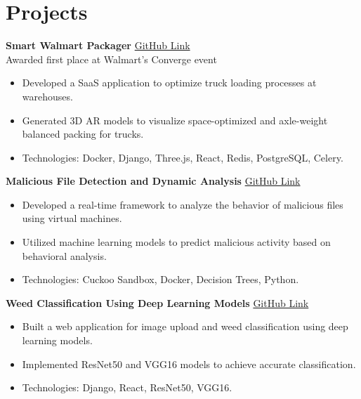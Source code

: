 \documentclass[a4paper,10pt]{article}
\begin{document}
\vspace{-1mm}

\section*{Projects}

\textbf{Smart Walmart Packager} \hfill \href{https://nalin-kumar-gupta.github.io/swp-demo/index.html}{GitHub Link} \\
Awarded first place at Walmart’s Converge event \\
\vspace{-5mm}
\begin{itemize}[noitemsep]
    \item Developed a SaaS application to optimize truck loading processes at warehouses.
    \item Generated 3D AR models to visualize space-optimized and axle-weight balanced packing for trucks.
    \item Technologies: Docker, Django, Three.js, React, Redis, PostgreSQL, Celery.
\end{itemize}

\vspace{-1mm}
\textbf{Malicious File Detection and Dynamic Analysis} \hfill \href{https://nalin-kumar-gupta.github.io/amd-demo/}{GitHub Link} \\
\vspace{-5mm}
\begin{itemize}[noitemsep]
    \item Developed a real-time framework to analyze the behavior of malicious files using virtual machines.
    \item Utilized machine learning models to predict malicious activity based on behavioral analysis.
    \item Technologies: Cuckoo Sandbox, Docker, Decision Trees, Python.
\end{itemize}

\vspace{-1mm}
\textbf{Weed Classification Using Deep Learning Models} \hfill \href{https://nalin-kumar-gupta.github.io/weed-classifi-demo/}{GitHub Link} \\
\vspace{-5mm}
\begin{itemize}[noitemsep]
    \item Built a web application for image upload and weed classification using deep learning models.
    \item Implemented ResNet50 and VGG16 models to achieve accurate classification.
    \item Technologies: Django, React, ResNet50, VGG16.
\end{itemize}
\end{document}

